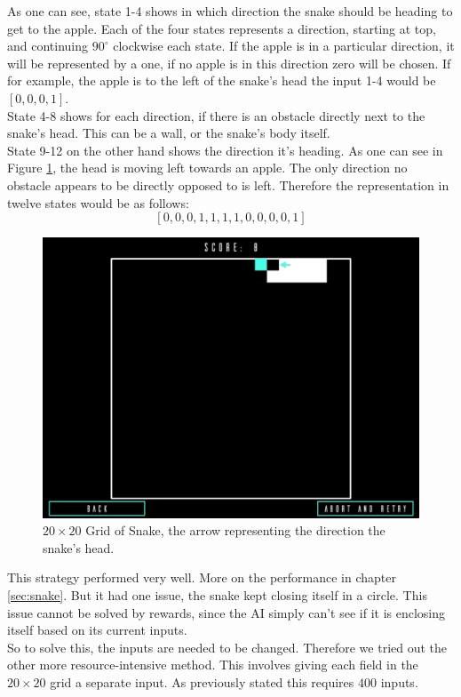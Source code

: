 \documentclass[12pt]{article}
\begin{document}
As one can see, state 1-4 shows in which direction the snake should be heading to get to the apple. Each of the four states represents a direction, starting at top, and continuing $90^\circ$ clockwise each state. If the apple is in a particular direction, it will be represented by a one, if no apple is in this direction zero will be chosen.
If for example, the apple is to the left of the snake's head the input 1-4 would be $[0,0,0,1]$. \\
State 4-8 shows for each direction, if there is an obstacle directly next to the snake's head. This can be a wall, or the snake's body itself. \cite{snakeDQN}\\
State 9-12 on the other hand shows the direction it's heading. As one can see in Figure \ref{fig:snake4States}, the head is moving left towards an apple. The only direction no obstacle appears to be directly opposed to is left. Therefore the representation in twelve states would be as follows: \[[0,0,0,1,1,1,1,0,0,0,0,1]\]
\begin{figure}[ht]
    \centering
    \includegraphics[width=0.9\linewidth]{pictures/ScreenShotStatesExplained.png}
    \caption{$20{\times}20$ Grid of Snake, the arrow representing the direction the snake's head.}
    \label{fig:snake4States}
\end{figure}
This strategy performed very well. More on the performance in chapter \ref{sec:snake}. But it had one issue, the snake kept closing itself in a circle. This issue cannot be solved by rewards, since the AI simply can't see if it is enclosing itself based on its current inputs. \\
So to solve this, the inputs are needed to be changed. Therefore we tried out the other more resource-intensive method. This involves giving each field in the $20{\times}20$ grid a separate input. As previously stated this requires $400$ inputs. \\
\end{document}
